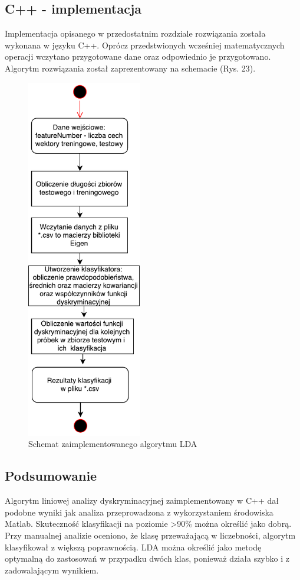 \documentclass[[10pt,a4paper]{article}
\begin{document}
\subsection{C++ - implementacja}
Implementacja opisanego w przedostatnim rozdziale rozwiązania została wykonana w języku C++. Oprócz przedstwionych wcześniej matematycznych operacji wczytano przygotowane dane oraz odpowiednio je przygotowano. Algorytm rozwiązania został zaprezentowany na schemacie  (Rys. 23).
\begin{figure}
	\begin{center}
			\includegraphics[width=5cm]{LDA_schemat.pdf}
		\caption{Schemat zaimplementowanego algorytmu LDA}
	\end{center}
\end{figure}


\subsection{Podsumowanie}
Algorytm liniowej analizy dyskryminacyjnej zaimplementowany w C++ dał podobne wyniki jak analiza przeprowadzona z wykorzystaniem środowiska Matlab. Skuteczność klasyfikacji na poziomie >90\% można określić jako dobrą. Przy manualnej analizie oceniono, że klasę przeważającą w liczebności, algorytm klasyfikował z większą poprawnością. LDA można określić jako metodę optymalną do zastosowań w przypadku dwóch klas, ponieważ działa szybko i z zadowalającym wynikiem. 
\end{document}
